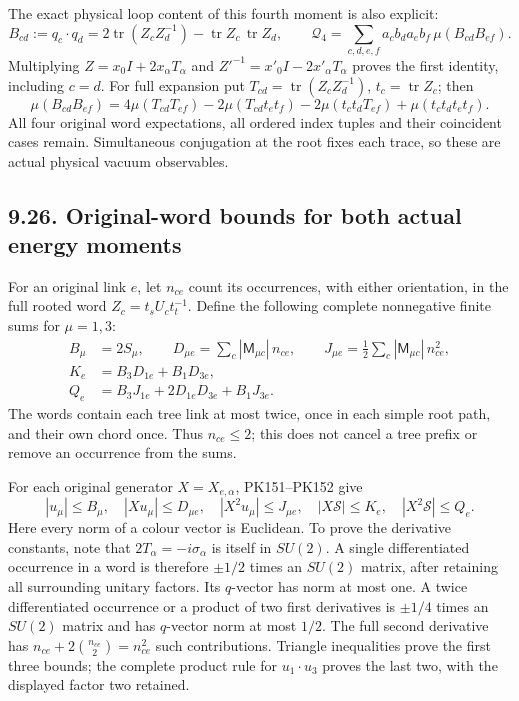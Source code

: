 \documentclass[11pt]{article}
\begin{document}
The exact physical loop content of this fourth moment is also explicit:
\[
 B_{cd}:=q_c\cdot q_d
       =2\operatorname{tr}(Z_cZ_d^{-1})
                         -\operatorname{tr}Z_c\,\operatorname{tr}Z_d,
 \qquad
 \mathcal Q_4=\sum_{c,d,e,f}a_cb_da_eb_f\,\mu(B_{cd}B_{ef}).
 \tag{PK170}
\]
Multiplying \(Z=x_0I+2x_\alpha T_\alpha\) and
\(Z'^{-1}=x'_0I-2x'_\alpha T_\alpha\) proves the first identity,
including \(c=d\). For full expansion put
\(T_{cd}=\operatorname{tr}(Z_cZ_d^{-1})\), \(t_c=\operatorname{tr}Z_c\);
then
\[
 \mu(B_{cd}B_{ef})
 =4\mu(T_{cd}T_{ef})-2\mu(T_{cd}t_et_f)
                    -2\mu(t_ct_dT_{ef})+\mu(t_ct_dt_et_f).
 \tag{PK171}
\]
All four original word expectations, all ordered index tuples and
their coincident cases remain. Simultaneous conjugation at the root
fixes each trace, so these are actual physical vacuum observables.

\subsection*{9.26. Original-word bounds for both actual energy moments}

For an original link \(e\), let \(n_{ce}\) count its occurrences,
with either orientation, in the full rooted word \(Z_c=t_sU_ct_t^{-1}\).
Define the following complete nonnegative finite sums for \(\mu=1,3\):
\[
 \begin{split}
 B_\mu&=2S_\mu,\qquad
 D_{\mu e}=\sum_c|\mathsf M_{\mu c}|\,n_{ce},\qquad
 J_{\mu e}=\frac12\sum_c|\mathsf M_{\mu c}|\,n_{ce}^2,\\
 K_e&=B_3D_{1e}+B_1D_{3e},\\
 Q_e&=B_3J_{1e}+2D_{1e}D_{3e}+B_1J_{3e}.
 \end{split}\tag{PK172}
\]
The words contain each tree link at most twice, once in each simple
root path, and their own chord once. Thus \(n_{ce}\le2\);
this does not cancel a tree prefix or remove an occurrence from the sums.

For each original generator \(X=X_{e,\alpha}\), PK151–PK152 give
\[
 |u_\mu|\le B_\mu,\quad
 |Xu_\mu|\le D_{\mu e},\quad |X^2u_\mu|\le J_{\mu e},\quad
 |X\mathcal S|\le K_e,\quad |X^2\mathcal S|\le Q_e .
 \tag{PK173}
\]
Here every norm of a colour vector is Euclidean. To prove the derivative
constants, note that \(2T_\alpha=-i\sigma_\alpha\) is itself in
\(SU(2)\). A single differentiated occurrence in a word is therefore
\(\pm1/2\) times an \(SU(2)\) matrix, after retaining all surrounding
unitary factors. Its \(q\)-vector has norm at most one.
A twice differentiated occurrence or a product of two first derivatives
is \(\pm1/4\) times an \(SU(2)\) matrix and has \(q\)-vector norm at most
\(1/2\). The full second derivative has
\(n_{ce}+2\binom{n_{ce}}2=n_{ce}^2\) such contributions.
Triangle inequalities prove the first three bounds; the complete
product rule for \(u_1\cdot u_3\) proves the last two, with the
displayed factor two retained.
\end{document}
